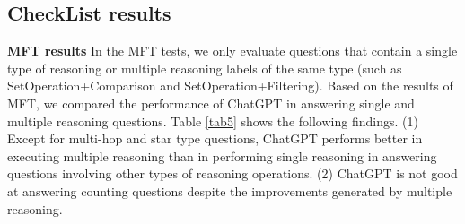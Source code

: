 \documentclass[runningheads]{llncs}
\begin{document}
\begin{table}[t]\centering
\caption{INV results of GPT family}\label{tab6}
\end{table}

\begin{table}[t]\centering
\caption{DIR results for RsgType, the score represents the percentage of expected output produced by the LLMs. } \label{tab9}
\end{table}

\subsection{CheckList results}
\textbf{MFT results}
In the MFT tests, we only evaluate questions that contain a single type of reasoning or multiple reasoning labels of the same type (such as SetOperation+Comparison and SetOperation+Filtering). Based on the results of MFT, we compared the performance of ChatGPT in answering single and multiple reasoning questions. Table \ref{tab5} shows the following findings. (1) Except for multi-hop and star type questions, ChatGPT performs better in executing multiple reasoning than in performing single reasoning in answering questions involving other types of reasoning operations. (2) ChatGPT is not good at answering counting questions despite the improvements generated by multiple reasoning.
\end{document}
